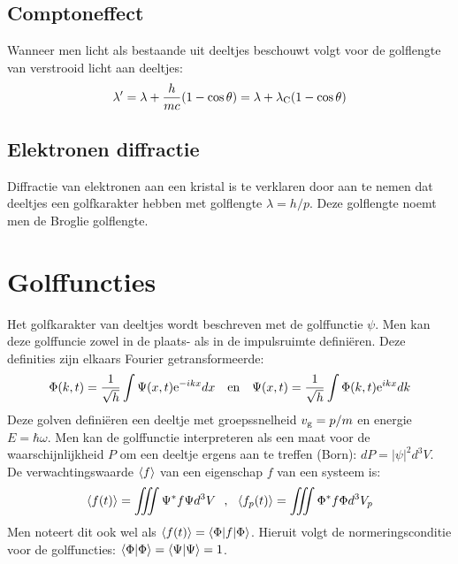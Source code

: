 \subsection{Comptoneffect}
Wanneer men licht als bestaande uit deeltjes beschouwt volgt voor de
golflengte van verstrooid licht aan deeltjes:
\[
\lambda'=\lambda+\frac{h}{mc}(1-\cos\theta)=\lambda+\lambda_{\rm C}(1-\cos\theta)
\]

\subsection{Elektronen diffractie}
Diffractie van elektronen aan een kristal is te verklaren door aan te nemen
dat deeltjes een golfkarakter hebben met golflengte $\lambda=h/p$. Deze
golflengte noemt men de Broglie golflengte.

\section[~~Golffuncties]{Golffuncties}
Het golfkarakter van deeltjes wordt beschreven met de golffunctie $\psi$. Men
kan deze golffuncie zowel in de plaats- als in de impulsruimte defini\"eren.
Deze definities zijn elkaars Fourier getransformeerde:
\[
\Phi(k,t)=\frac{1}{\sqrt{h}}\int\Psi(x,t){\rm e}^{-ikx}dx~~~\mbox{en}~~~
\Psi(x,t)=\frac{1}{\sqrt{h}}\int\Phi(k,t){\rm e}^{ikx}dk
\]
Deze golven defini\"eren een deeltje met groepssnelheid $v_{\rm g}=p/m$ en
energie $E=\hbar\omega$.
\npar
Men kan de golffunctie interpreteren als een maat voor de waarschijnlijkheid
$P$ om een deeltje ergens aan te treffen (Born): $dP=|\psi|^2d^3V$. De
verwachtingswaarde $\left\langle f \right\rangle$ van een eigenschap $f$ van een systeem is:
\[
\av{f(t)}=\iiint\Psi^* f\Psi d^3V~~,~~\av{f_p(t)}=\iiint\Phi^*f\Phi d^3V_p
\]
Men noteert dit ook wel als $\left\langle f(t) \right\rangle=\left\langle \Phi|f|\Phi \right\rangle$. Hieruit volgt de
normeringsconditie voor de golffuncties: $\left\langle \Phi|\Phi \right\rangle=\left\langle \Psi|\Psi \right\rangle=1$.

